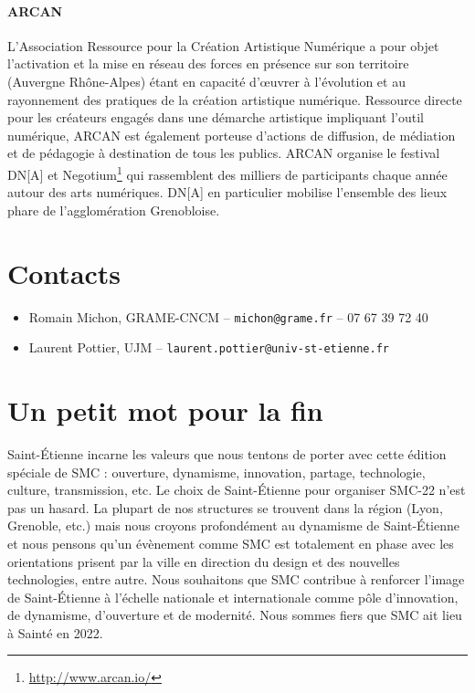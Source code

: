 \documentclass[fontsize=12pt]{scrartcl} %
\numberwithin{equation}{section} %
\numberwithin{table}{section} %
\begin{document}
\paragraph{\textbf{ARCAN}} L'Association Ressource pour la Création Artistique Numérique a pour objet l'activation et la mise en réseau des forces en présence sur son territoire (Auvergne Rhône-Alpes) étant en capacité d'œuvrer à l'évolution et au rayonnement des pratiques de la création artistique numérique. Ressource directe pour les créateurs engagés dans une démarche artistique impliquant l'outil numérique, ARCAN est également porteuse d'actions de diffusion, de médiation et de pédagogie à destination de tous les publics. ARCAN organise le festival DN[A] et Negotium\footnote{\url{http://www.arcan.io/}} qui rassemblent des milliers de participants chaque année autour des arts numériques. DN[A] en particulier mobilise l'ensemble des lieux phare de l'agglomération Grenobloise.

\section{Contacts}

\begin{itemize}
\item Romain Michon, GRAME-CNCM -- \texttt{michon@grame.fr} -- 07 67 39 72 40
\item Laurent Pottier, UJM -- \texttt{laurent.pottier@univ-st-etienne.fr} %
\end{itemize}

\section{Un petit mot pour la fin}

Saint-Étienne incarne les valeurs que nous tentons de porter avec cette édition spéciale de SMC : ouverture, dynamisme, innovation, partage, technologie, culture, transmission, etc. Le choix de Saint-Étienne pour organiser SMC-22 n'est pas un hasard. La plupart de nos structures se trouvent dans la région (Lyon, Grenoble, etc.) mais nous croyons profondément au dynamisme de Saint-Étienne et nous pensons qu'un évènement comme SMC est totalement en phase avec les orientations prisent par la ville en direction du design et des nouvelles technologies, entre autre. Nous souhaitons que SMC contribue à renforcer l'image de Saint-Étienne à l'échelle nationale et internationale comme pôle d'innovation, de dynamisme, d'ouverture et de modernité. Nous sommes fiers que SMC ait lieu à Sainté en 2022. 
\end{document}
